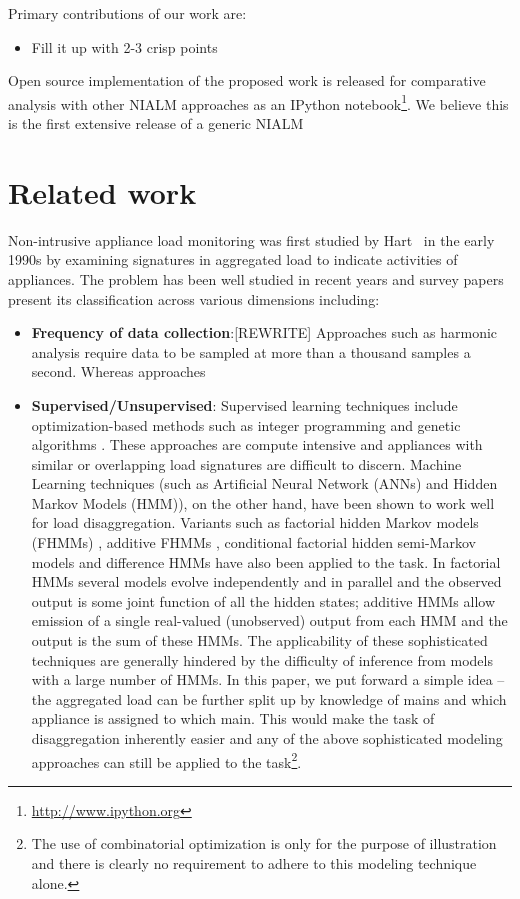 \documentclass[conference]{IEEEtran}
\begin{document}
Primary contributions of our work are:
\begin{itemize}
\item Fill it up with 2-3 crisp points
\end{itemize}
Open source implementation of the proposed work is released for comparative analysis with other NIALM approaches as an IPython notebook\footnote{\url{http://www.ipython.org}}. We believe this is the first extensive release of a generic NIALM

\section{Related work}
\noindent Non-intrusive appliance load monitoring was first studied by Hart~\cite{hart} in the early 1990s by examining signatures in aggregated load to indicate activities of appliances. The problem has been well studied in recent years and survey papers \cite{survey1,survey2,survey3} present its classification across various dimensions including:
\begin{itemize}
\item \textbf{Frequency of data collection}:[REWRITE] Approaches such as harmonic analysis require data to be sampled at more than a thousand samples a second. Whereas approaches 
\item \textbf{Supervised/Unsupervised}: Supervised learning techniques include optimization-based methods such as integer programming \cite{Suzuki_08} and genetic algorithms \cite{Baranski_04}. These approaches are compute intensive and appliances with similar or overlapping load signatures are difficult to discern. Machine Learning techniques (such as Artificial Neural Network (ANNs) \cite{Ruzzelli_10} and Hidden Markov Models (HMM)\cite{Zia_11}), on the other hand, have been shown to work well for load disaggregation. Variants such as factorial hidden Markov models (FHMMs) \cite{Ghahramani_97a}, additive FHMMs \cite{Kolter_12}, conditional factorial hidden semi-Markov models \cite{Kim_11} and difference HMMs \cite{parson2012_aaai} have also been applied to the task. In factorial HMMs several models evolve independently and in parallel and the observed output is some joint function of all the hidden states; additive HMMs allow emission of a single real-valued (unobserved) output from each HMM and the output is the sum of these HMMs. The applicability of these sophisticated techniques are generally hindered by the difficulty of inference from models with a large number of HMMs. In this paper, we put forward a simple idea -- the aggregated load can be further split up by knowledge of mains and which appliance is assigned to which main. This would make the task of disaggregation inherently easier and any of the above sophisticated modeling approaches can still be applied to the task\footnote{The use of combinatorial optimization is only for the purpose of illustration and there is clearly no requirement to adhere to this modeling technique alone.}. 

\end{itemize}
\end{document}
